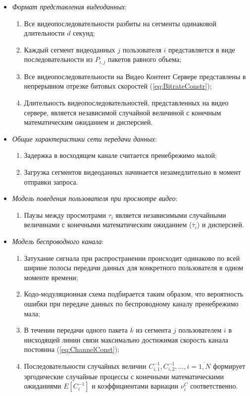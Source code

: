 \begin{itemize}
	\item \textit{Формат представления видеоданных}:
		\begin{enumerate}
			\item Все видеопоследовательности разбиты на сегменты одинаковой длительности $d$ секунд;
			\item Каждый сегмент видеоданных $j$ пользователя $i$ представляется в виде последовательности из $P_{i,j}$ пакетов равного объема;
			\item Все видеопоследовательности на Видео Контент Сервере представлены в непрерывном отрезке битовых скоростей (\ref{eq:BitrateConstr});
			\item Длительность видеопоследовательностей, представленных на видео сервере, является независимой случайной величиной с конечным математическим ожиданием и дисперсией.
		\end{enumerate}
	\item \textit{Общие характеристики сети передачи данных}:
		\begin{enumerate}
			\item Задержка в восходящем канале считается пренебрежимо малой;
			\item Загрузка сегментов видеоданных начинается незамедлительно в момент отправки запроса.
		\end{enumerate}
	\item \textit{Модель поведения пользователя при просмотре видео}:
		\begin{enumerate}
			\item Паузы между просмотрами $\tau_i$ является независимыми случайными величинами с конечными математическим ожиданием ($\overline{\tau}_i$) и дисперсией.
		\end{enumerate}
	\item \textit{Модель беспроводного канала}:
		\begin{enumerate}
			\item Затухание сигнала при распространении происходит одинаково по всей ширине полосы передачи данных для конкретного пользователя в одном моменте времени;
			\item Кодо-модуляционная схема подбирается таким образом, что вероятность ошибки при передаче данных по беспроводному каналу пренебрежимо мала;
			\item В течении передачи одного пакета $k$ из сегмента $j$ пользователем $i$ в нисходящей линии связи максимально достижимая скорость канала постоянна (\ref{eq:ChannelConst});
			\item Последовательности случайных величин $C^{-1}_{i,1}, C^{-1}_{i,2}, \ldots, i=\overline{1,N}$  формирует эргодические случайные процессы с конечными математическими ожиданиями $E[C_i^{-1}]$ и коэффициентами вариации $\nu^{C}_i$ соответственно.

\end{enumerate}
\end{itemize}
